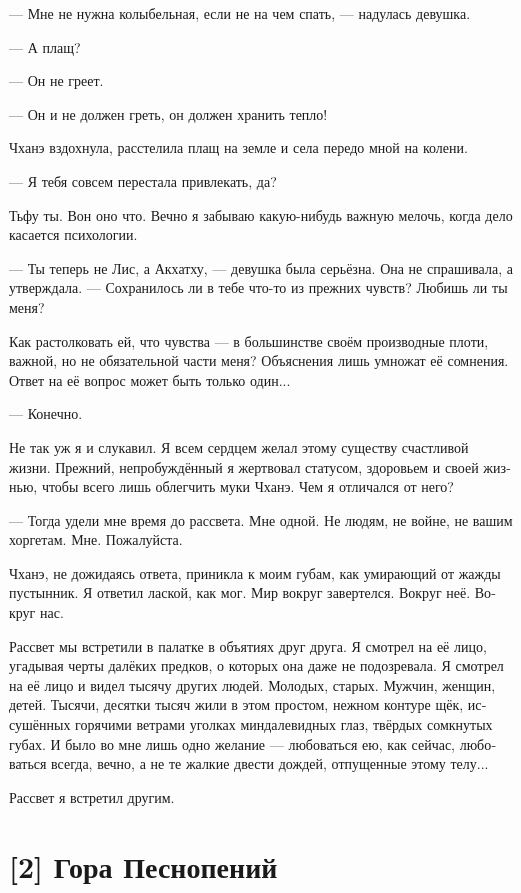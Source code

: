 \documentclass[a4paper,12pt,fleqn]{book}\usepackage{polyglossia}\setdefaultlanguage[babelshorthands=true]{russian}\setotherlanguage{english}\defaultfontfeatures{Ligatures=TeX,Mapping=tex-text}\usepackage{xcolor}\newcommand{\ml}[3]{#2}
\begin{document}
{--- Мне не нужна колыбельная, если не на чем спать, --- надулась девушка.

--- А плащ?

--- Он не греет.

--- Он и не должен греть, он должен хранить тепло!

Чханэ вздохнула, расстелила плащ на земле и села передо мной на колени.

--- Я тебя совсем перестала привлекать, да?

Тьфу ты.
Вон оно что.
Вечно я забываю какую-нибудь важную мелочь, когда дело касается психологии.

--- Ты теперь не Лис, а Акхатху, --- девушка была серьёзна.
Она не спрашивала, а утверждала.
--- Сохранилось ли в тебе что-то из прежних чувств?
Любишь ли ты меня?

Как растолковать ей, что чувства --- в большинстве своём производные плоти, важной, но не обязательной части меня?
Объяснения лишь умножат её сомнения.
Ответ на её вопрос может быть только один...

--- Конечно.

Не так уж я и слукавил.
Я всем сердцем желал этому существу счастливой жизни.
Прежний, непробуждённый я жертвовал статусом, здоровьем и своей жизнью, чтобы всего лишь облегчить муки Чханэ.
Чем я отличался от него?

--- Тогда удели мне время до рассвета.
Мне одной.
Не людям, не войне, не вашим хоргетам.
Мне.
Пожалуйста.

Чханэ, не дожидаясь ответа, приникла к моим губам, как умирающий от жажды пустынник.
Я ответил лаской, как мог.
Мир вокруг завертелся.
Вокруг неё.
Вокруг нас.

Рассвет мы встретили в палатке в объятиях друг друга.
Я смотрел на её лицо, угадывая черты далёких предков, о которых она даже не подозревала.
Я смотрел на её лицо и видел тысячу других людей.
Молодых, старых.
Мужчин, женщин, детей.
Тысячи, десятки тысяч жили в этом простом, нежном контуре щёк, иссушённых горячими ветрами уголках миндалевидных глаз, твёрдых сомкнутых губах.
И было во мне лишь одно желание --- любоваться ею, как сейчас, любоваться всегда, вечно, а не те жалкие двести дождей, отпущенные этому телу...

Рассвет я встретил другим.

\section{[2] Гора Песнопений}

}
\end{document}
